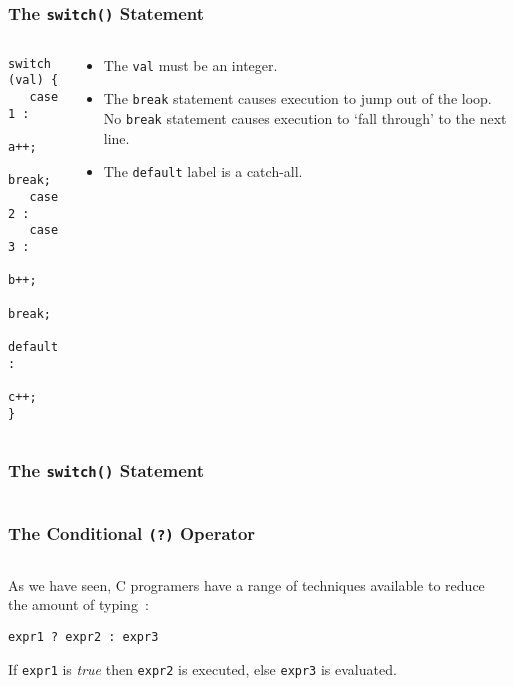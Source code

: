 \begin{frame}[fragile]
\frametitle{The {\tt switch()} Statement}
\begin{columns}

\begin{column}{0.45\textwidth}
\begin{lstlisting}[style=basicc,numbers=none]
switch (val) {
   case 1 :
      a++;
      break;
   case 2 :
   case 3 :
      b++;
      break;
   default :
      c++;
}
\end{lstlisting}
\end{column}

\begin{column}{0.45\textwidth}
\begin{itemize}[<+->]
\item The \verb^val^ must be an integer.
\item The \verb^break^ statement causes execution to jump out
of the loop. No \verb^break^ statement causes execution to
`fall through' to the next line.
\item The \verb^default^ label is a catch-all.
\end{itemize}
\end{column}

\end{columns}
\end{frame}

\begin{frame}[fragile]
\frametitle{The {\tt switch()} Statement}
\begin{columns}

\begin{column}{0.55\textwidth}

\end{column}

\begin{column}{0.40\textwidth}
\end{column}

\end{columns}
\end{frame}

\begin{frame}[fragile]
\frametitle{The Conditional {\tt (?)} Operator}
\begin{columns}

\begin{column}{0.40\textwidth}
As we have seen, C programers have a range of techniques available to reduce the amount of typing~:
\begin{lstlisting}[style=basicc,numbers=none]
expr1 ? expr2 : expr3
\end{lstlisting}

If {\tt expr1} is {\it true} then {\tt expr2} is executed, else
{\tt expr3} is evaluated.
\end{column}

\begin{column}{0.55\textwidth}

\end{column}

\end{columns}
\end{frame}
